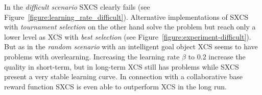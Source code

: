 




In the \emph{difficult scenario} SXCS clearly fails (see Figure~\ref{figure:learning_rate_difficult}). Alternative implementations of SXCS with \emph{tournament selection} on the other hand solve the problem but reach only a lower level as XCS with \emph{best selection} (see Figure~\ref{figure:experiment-difficult}). But as in the \emph{random scenario} with an intelligent goal object XCS seems to have problems with overlearning. Increasing the learning rate $\beta$ to $0.2$ increase the quality in short-term, but in long-term XCS still has problems while SXCS present a very stable learning curve. In connection with a collaborative base reward function SXCS is even able to outperform XCS in the long run.\\
